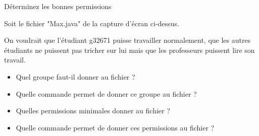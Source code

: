 \documentclass[a4paper,11pt]{article}
\begin{document}
\begin{Exercice}{D\'eterminez les bonnes permissions}
	
	
	Soit le fichier "Max.java" de la capture d'\'ecran ci-dessus.
	
	On voudrait que l'\'etudiant g32671 puisse travailler  
	normalement, que les autres \'etudiants ne puissent pas tricher sur  
	lui mais que les professeurs puissent lire son travail.   
	
	\begin{itemize}
		
		\item 
		Quel groupe faut-il donner au fichier ?
		\par
		\textcolor{gray}{\underline{\hspace*{10em}}} 
		\item 
		Quelle commande permet de donner ce groupe au fichier ?
		\par
		\textcolor{gray}{\underline{\hspace*{3em}}}  \textcolor{gray}{\underline{\hspace*{10em}}}  \textcolor{gray}{\underline{\hspace*{10em}}} 
		\item 
		Quelles permissions minimales donner au fichier ?                
		\par
		\textcolor{gray}{\underline{\hspace*{1em}}}  \textcolor{gray}{\underline{\hspace*{1em}}}  \textcolor{gray}{\underline{\hspace*{1em}}}  \textcolor{gray}{\underline{\hspace*{1em}}}  \textcolor{gray}{\underline{\hspace*{1em}}}  \textcolor{gray}{\underline{\hspace*{1em}}}  \textcolor{gray}{\underline{\hspace*{1em}}}  \textcolor{gray}{\underline{\hspace*{1em}}}  \textcolor{gray}{\underline{\hspace*{1em}}} 
		\item 
		Quelle commande permet de donner ces permissions au fichier ?
		\par
		\textcolor{gray}{\underline{\hspace*{3em}}}  \textcolor{gray}{\underline{\hspace*{2em}}}  \textcolor{gray}{\underline{\hspace*{10em}}} 
	\end{itemize}
	
	
\end{Exercice}
\end{document}
